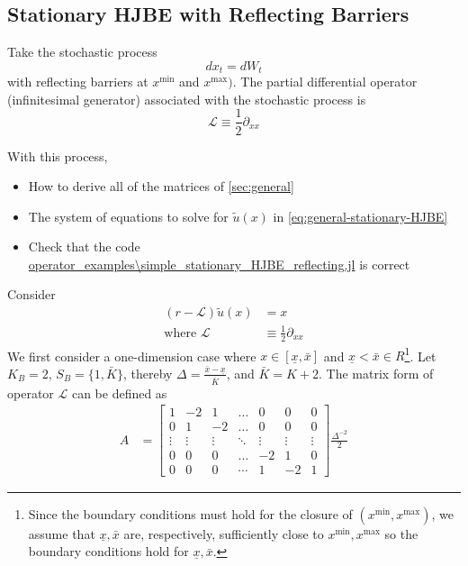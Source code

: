 \documentclass[11pt]{article}
\newcommand{\D}[1][]{\ensuremath{\partial_{#1}}}
\begin{document}
\subsection{Stationary HJBE with Reflecting Barriers}
Take the stochastic process
$$
d x_t = d W_t
$$
with reflecting barriers at $x^{\min}$ and $x^{\max})$.  The partial differential operator (infinitesimal generator) associated with the stochastic process is
$$
	\mathcal{L} \equiv \frac{1}{2}\D[xx]
$$

With this process,
\begin{itemize}
	\item How to derive all of the matrices of \cref{sec:general}
	\item The system of equations to solve for $\tilde{u}(x)$ in \cref{eq:general-stationary-HJBE}
	\item Check that the code \url{operator_examples\simple_stationary_HJBE_reflecting.jl} is correct
\end{itemize}
Consider
\begin{align}
(r - \mathcal{L} )\tilde{u}(x) &= x\label{HJBE_reflecting_barriers_PDE}\\
\text{where }\mathcal{L}&\equiv \frac{1}{2}\partial_{xx}
\end{align}
We first consider a one-dimension case where $x\in [\underline{\textit{\~{x}}}, \bar{\textit{\~{x}}}]$ and $\underline{\textit{\~{x}}} < \bar{\textit{\~{x}}} \in R$\footnote{Since the boundary conditions must hold for the closure of $(x^{\min},x^{\max})$, we assume that $\underline{\textit{\~{x}}}, \bar{\textit{\~{x}}}$ are, respectively, sufficiently close to $x^{\min}, x^{\max}$ so the boundary conditions hold for $\underline{\textit{\~{x}}}, \bar{\textit{\~{x}}}$.}. Let $K_B = 2$, $S_B = \{1,\bar{K}\}$, thereby $\Delta  = \frac{\bar{\textit{\~{x}}}-\underline{\textit{\~{x}}}}{\bar{K}}$, and $\bar{K} = K+2$. The matrix form of operator $\mathcal{L}$ can be defined as
\begin{align}
A &= \begin{bmatrix}
1&-2&1&\dots&0&0&0\\
0&1&-2&\dots&0&0&0\\
\vdots&\vdots&\vdots&\ddots&\vdots&\vdots&\vdots\\
0&0&0&\dots&-2&1&0\\
0&0&0&\cdots&1&-2&1
\end{bmatrix}\frac{\Delta^{-2}}{2}
\end{align}
\end{document}
